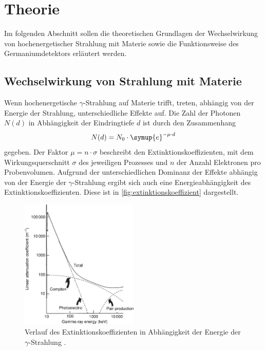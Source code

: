 \section{Theorie}
\label{sec:theorie}

Im folgenden Abschnitt sollen die theoretischen Grundlagen der Wechselwirkung von hochenergetischer Strahlung mit Materie
sowie die Funktionsweise des Germaniumdetektors erläutert werden.


\subsection{Wechselwirkung von Strahlung mit Materie}
\label{sec:wechselwirkungen}

Wenn hochenergetische $\gamma$-Strahlung auf Materie trifft,
treten,
abhängig von der Energie der Strahlung,
unterschiedliche Effekte auf.
Die Zahl der Photonen $N(d)$ in Abhängigkeit der Eindringtiefe $d$ ist durch den Zusammenhang
\begin{equation}
    N(d) = N_0 \cdot \symup{e}^{-\mu \cdot d}
\end{equation}
gegeben.
Der Faktor $\mu = n \cdot \sigma$ beschreibt den Extinktionskoeffizienten,
mit dem Wirkungsquerschnitt $\sigma$ des jeweiligen Prozesses und $n$ der Anzahl Elektronen pro Probenvolumen.
Aufgrund der unterschiedlichen Dominanz der Effekte abhängig von der Energie der $\gamma$-Strahlung ergibt sich auch eine Energieabhängigkeit des Extinktionskoeffizienten.
Diese ist in \autoref{fig:extinktionskoeffizient} dargestellt.
\begin{figure}
    \centering
    \includegraphics[width=0.5\textwidth]{content/img/Gilmore_Abb_2.3.pdf}
    \caption{Verlauf des Extinktionskoeffizienten in Abhängigkeit der Energie der $\gamma$-Strahlung \cite{gilmore}.}
    \label{fig:extinktionskoeffizient}
\end{figure}


